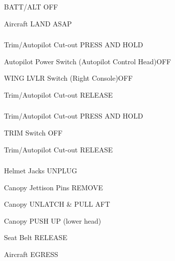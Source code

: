 \begin{multicols}{2}
\subsubsection*{}
\begin{enumerate*}
  \item BATT/ALT \dotfill OFF
  \item Aircraft \dotfill LAND ASAP
  \end{enumerate*}

\subsubsection*{}
\begin{enumerate*}
  \item Trim/Autopilot Cut-out \dotfill PRESS AND HOLD
  \item Autopilot Power Switch (Autopilot Control Head)\dotfill OFF
  \item WING LVLR Switch (Right Console)\dotfill OFF
  \item Trim/Autopilot Cut-out \dotfill RELEASE
  \end{enumerate*}

\subsubsection*{}
\begin{enumerate*}
  \item Trim/Autopilot Cut-out \dotfill PRESS AND HOLD
  \item TRIM Switch \dotfill OFF
  \item Trim/Autopilot Cut-out \dotfill RELEASE
  \end{enumerate*}

\subsubsection*{}

\begin{enumerate*}
\item Helmet Jacks \dotfill UNPLUG
\item Canopy Jettison Pins \dotfill REMOVE
\item Canopy \dotfill UNLATCH \& PULL AFT
\item Canopy \dotfill PUSH UP (lower head)
\item Seat Belt \dotfill RELEASE
\item Aircraft \dotfill EGRESS
\end{enumerate*}


\end{multicols}
